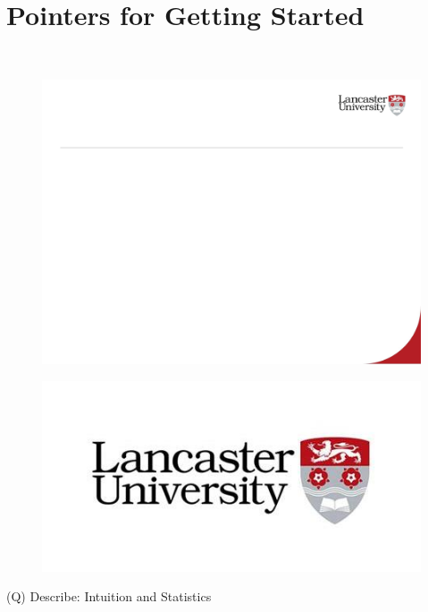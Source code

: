 \documentclass[12pt]{article}
\begin{document}
\section{Pointers for Getting Started}
\\
\begin{figure}[H]
\includegraphics[width=0.5\linewidth]{page57-image-1.png}
\end{figure}
\begin{figure}[H]
\includegraphics[width=0.5\linewidth]{page57-image-2.png}
\end{figure}
\clearpage
(Q)
Describe: Intuition and Statistics
\clearpage
\end{document}
